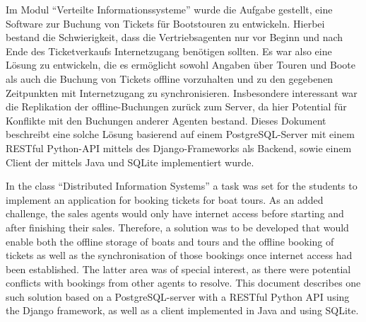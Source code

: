\documentclass[12pt,a4paper,ngerman,english]{report}
\newenvironment{abstractpage}
{\cleardoublepage\vspace*{\fill}\thispagestyle{empty}}
{\vfill\cleardoublepage}
\newenvironment{abstrac}[1]
{\bigskip\selectlanguage{#1}%
	\begin{center}\bfseries\abstractname\end{center}}
{\par\bigskip}
\begin{document}
\newpage
\begin{abstractpage}
	\begin{abstrac}{ngerman}
    Im Modul ``Verteilte Informationssysteme'' wurde die Aufgabe gestellt, eine Software zur Buchung von Tickets für Bootstouren zu entwickeln. Hierbei bestand die Schwierigkeit, dass die Vertriebsagenten nur vor Beginn und nach Ende des Ticketverkaufs Internetzugang benötigen sollten. Es war also eine Lösung zu entwickeln, die es ermöglicht sowohl Angaben über Touren und Boote als auch die Buchung von Tickets offline vorzuhalten und zu den gegebenen Zeitpunkten mit Internetzugang zu synchronisieren. Insbesondere interessant war die Replikation der offline-Buchungen zurück zum Server, da hier Potential für Konflikte mit den Buchungen anderer Agenten bestand. Dieses Dokument beschreibt eine solche Lösung basierend auf einem PostgreSQL-Server mit einem RESTful Python-API mittels des Django-Frameworks als Backend, sowie einem Client der mittels Java und SQLite implementiert wurde.
	\end{abstrac}
	\begin{abstrac}{english}
    In the class ``Distributed Information Systems'' a task was set for the students to implement an application for booking tickets for boat tours. As an added challenge, the sales agents would only have internet access before starting and after finishing their sales. Therefore, a solution was to be developed that would enable both the offline storage of boats and tours and the offline booking of tickets as well as the synchronisation of those bookings once internet access had been established. The latter area was of special interest, as there were potential conflicts with bookings from other agents to resolve. This document describes one such solution based on a PostgreSQL-server with a RESTful Python API using the Django framework, as well as a client implemented in Java and using SQLite. 
	\end{abstrac}
\end{abstractpage}



\newpage
\tableofcontents
\end{document}
